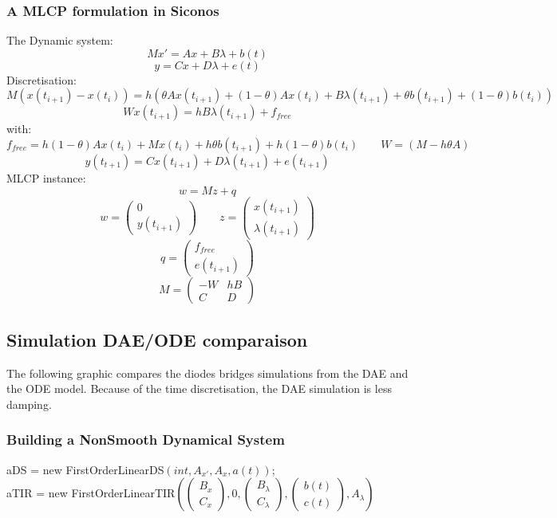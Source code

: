 \subsubsection{A MLCP formulation in Siconos}
The Dynamic system:
\[Mx'=Ax +B \lambda +b(t)\]
\[y=Cx +D \lambda +e(t)\]
Discretisation:
\[M(x(t_{i+1})-x(t_{i}))=h(\theta A x(t_{i+1}) + (1-\theta) A x(t_{i}) +B \lambda (t_{i+1}) +\theta
b(t_{i+1}) + (1-\theta) b(t_{i}))\]
\[Wx(t_{i+1})=hB \lambda (t_{i+1}) + f_{free}\]
with:
\[f_{free}=h(1-\theta) A x(t_{i}) + Mx(t_{i})+h \theta b(t_{i+1}) + h(1-\theta) b(t_{i}) \qquad W=(M-h\theta A)\]
\[y(t_{t+1})=Cx(t_{i+1}) +D \lambda(t_{i+1}) +e(t_{i+1})\]
MLCP instance:
\[w=Mz+q\]
\[w=\left(\begin{array}{c}0\\y(t_{i+1})\end{array}\right) \qquad
z=\left(\begin{array}{c}x(t_{i+1})\\ \lambda (t_{i+1})\end{array}\right)\]
\[q=\left(\begin{array}{c}f_{free}\\ e(t_{i+1})\end{array}\right)\]
\[M=\left(\begin{array}{cc}-W&hB\\ C&D\end{array}\right)\]
\newpage
\subsection{Simulation DAE/ODE comparaison}
The following graphic compares the diodes bridges simulations from the DAE and the ODE model. Because of the time
discretisation, the DAE simulation is less damping.
\begin{figure}[h]

\end{figure}
\newpage
\subsubsection{Building a NonSmooth Dynamical System}
 
 aDS = new FirstOrderLinearDS$(int,A_{x'},A_{x},a(t))$;\\
 aTIR = new FirstOrderLinearTIR$(\left(\begin{array}{c}B_{x}\\C_{x}
 \end{array}\right),0,\left(\begin{array}{c}B_{\lambda}\\C_{\lambda}
 \end{array}\right),\left(\begin{array}{c}b(t)\\c(t) \end{array}\right),A_{\lambda})$\\

